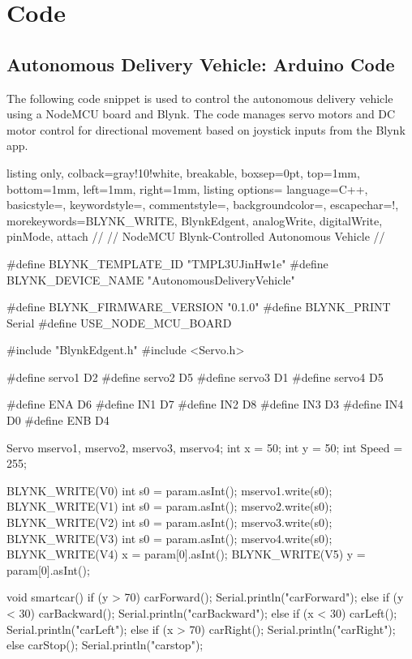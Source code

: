 \chapter{Code}
\section{Autonomous Delivery Vehicle: Arduino Code}
The following code snippet is used to control the autonomous delivery vehicle using a NodeMCU board and Blynk. The code manages servo motors and DC motor control for directional movement based on joystick inputs from the Blynk app.

\begin{tcblisting}{listing only,
  colback=gray!10!white, 
  breakable, 
  boxsep=0pt,
  top=1mm,
  bottom=1mm,
  left=1mm,
  right=1mm,
  listing options={
    language=C++,
    basicstyle=\small\ttfamily, 
    keywordstyle=\color{blue}, 
    commentstyle=\color{gray},
    backgroundcolor=\color{gray!25},
    escapechar=!,
    morekeywords={BLYNK_WRITE, BlynkEdgent, analogWrite, digitalWrite, pinMode, attach}
  }
}
//
// NodeMCU Blynk-Controlled Autonomous Vehicle
//

#define BLYNK_TEMPLATE_ID "TMPL3UJinHw1e"
#define BLYNK_DEVICE_NAME "AutonomousDeliveryVehicle"

#define BLYNK_FIRMWARE_VERSION        "0.1.0"
#define BLYNK_PRINT Serial
#define USE_NODE_MCU_BOARD

#include "BlynkEdgent.h"
#include <Servo.h>

#define servo1 D2
#define servo2 D5
#define servo3 D1
#define servo4 D5

#define ENA D6
#define IN1 D7
#define IN2 D8
#define IN3 D3
#define IN4 D0
#define ENB D4

Servo mservo1, mservo2, mservo3, mservo4;
int x = 50;
int y = 50;
int Speed = 255;

BLYNK_WRITE(V0) {
  int s0 = param.asInt(); 
  mservo1.write(s0);
}
BLYNK_WRITE(V1) {
  int s0 = param.asInt(); 
  mservo2.write(s0);
}
BLYNK_WRITE(V2) {
  int s0 = param.asInt(); 
  mservo3.write(s0);
}
BLYNK_WRITE(V3) {
  int s0 = param.asInt(); 
  mservo4.write(s0);
}
BLYNK_WRITE(V4) {
  x = param[0].asInt();
}
BLYNK_WRITE(V5) {
  y = param[0].asInt();
}

void smartcar() {
  if (y > 70) {
    carForward();
    Serial.println("carForward");
  } else if (y < 30) {
    carBackward();
    Serial.println("carBackward");
  } else if (x < 30) {
    carLeft();
    Serial.println("carLeft");
  } else if (x > 70) {
    carRight();
    Serial.println("carRight");
  } else {
    carStop();
    Serial.println("carstop");
  }
}


\end{tcblisting}

